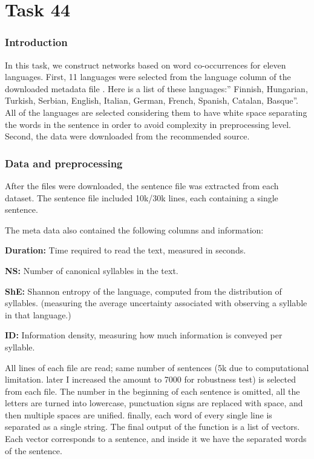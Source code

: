\chapter{Task 44}


\subsection{Introduction}
In this task, we construct networks based on word co-occurrences for eleven languages. First, 11 languages were selected from the language column of the downloaded metadata file \cite{keruiduo_supp}. Here is a list of these languages:” Finnish, Hungarian, Turkish, Serbian, English, Italian, German, French, Spanish, Catalan, Basque”. All of the languages are selected considering them to have white space separating the words in the sentence in order to avoid complexity in preprocessing level. Second, the data were downloaded from the recommended source\cite{leipzig_corpora}.
\subsection{Data and preprocessing}
 After the files were downloaded, the sentence file was extracted from each dataset. The sentence file included 10k/30k lines, each containing a single sentence.

\noindent
The meta data also contained the following columns and information:

\noindent
\textbf{Duration:} Time required to read the text, measured in seconds.

\noindent
\textbf{NS:} Number of canonical syllables in the text. 

\noindent
\textbf{ShE:} Shannon entropy of the language, computed from the distribution of syllables. (measuring the average uncertainty associated with observing a syllable in that language.)

\noindent
\textbf{ID:} Information density, measuring how much information is conveyed per syllable. 

\noindent
All lines of each file are read; same number of sentences (5k due to computational limitation. later I increased the amount to 7000 for robustness test) is selected from each file. The number in the beginning of each sentence is omitted, all the letters are turned into lowercase, punctuation signs are replaced with space, and then multiple spaces are unified. finally, each word of every single line is separated as a single string. The final output of the function is a list of vectors. Each vector corresponds to a sentence, and inside it we have the separated words of the sentence.

